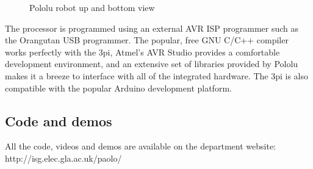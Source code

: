 \begin{figure}[ht]
  \begin{center}
	\hspace{1pt}
  \caption[Pololu robot up and bottom view]{Pololu robot up and bottom view}
  \end{center}
\end{figure}
The processor is programmed using an external AVR ISP programmer such as the Orangutan USB programmer.
The popular, free GNU C/C++ compiler works perfectly with the 3pi, Atmel’s AVR Studio provides a comfortable development environment, and an extensive set of libraries provided by Pololu makes it a breeze to interface with all of the integrated hardware. The 3pi is also compatible with the popular Arduino development platform.
\subsection{Code and demos}
All the code, videos and demos are available on the department website:
http://isg.elec.gla.ac.uk/paolo/

